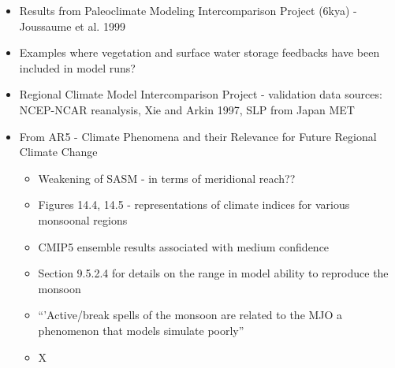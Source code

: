 \documentclass[11pt,reqno]{amsart}
\begin{document}
\begin{itemize}
\item Results from Paleoclimate Modeling Intercomparison Project (6kya) - Joussaume et al. 1999 
\item Examples where vegetation and surface water storage feedbacks have been included in model runs?  

\item Regional Climate Model Intercomparison Project - validation data sources: NCEP-NCAR reanalysis, Xie and Arkin 1997, SLP from Japan MET 


\item From AR5 - Climate Phenomena and their Relevance for Future Regional Climate Change
	\begin{itemize}
		\item Weakening of SASM - in terms of meridional reach?? 
		\item Figures 14.4, 14.5 - representations of climate indices for various monsoonal regions 
		\item CMIP5 ensemble results associated with medium confidence 
		\item Section 9.5.2.4 for details on the range in model ability to reproduce the monsoon 
		\item ``'Active/break spells of the monsoon are related to the MJO a phenomenon that models simulate poorly''
		\item X
	\end{itemize}



\end{itemize}
\end{document}
